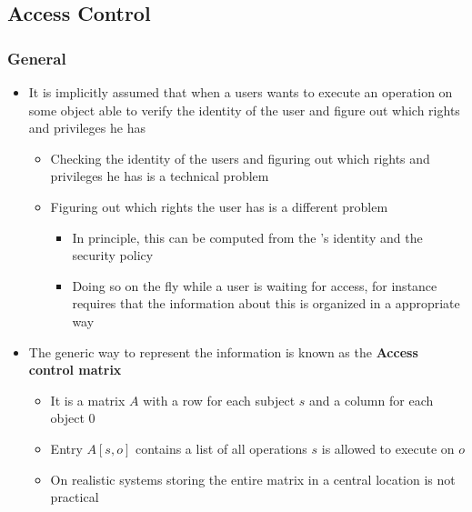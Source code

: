 \documentclass[11pt]{article}
\begin{document}
\subsection{Access Control}
\label{sec:orgeb170cc}
\subsubsection{General}
\label{sec:orgf9ad0ec}
\begin{itemize}
\item It is implicitly assumed that when a users wants to execute an operation on some object able to verify the identity of the user and figure out which rights and privileges he has
\begin{itemize}
\item Checking the identity of the users and figuring out which rights and privileges he has is a technical problem
\item Figuring out which rights the user has is a different problem
\begin{itemize}
\item In principle, this can be computed from the ’s identity and the security policy
\item Doing so on the fly while a user is waiting for access, for instance requires that the information about this is organized in a appropriate way
\end{itemize}
\end{itemize}

\item The generic way to represent the information is known as the \textbf{Access control matrix}
\begin{itemize}
\item It is a matrix \(A\) with a row for each subject \(s\) and a column for each object \(0\)
\item Entry \(A[s,o]\) contains a list of all operations \(s\) is allowed to execute on \(o\)
\item On realistic systems storing the entire matrix in a central location is not practical
\end{itemize}


\end{itemize}
\end{document}
